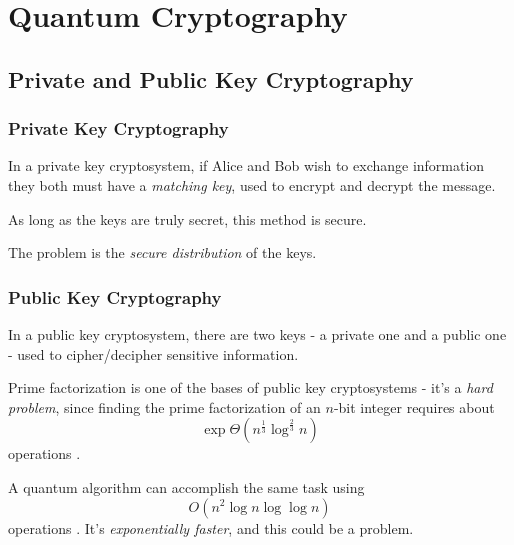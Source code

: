 \documentclass{beamer}
\begin{document}
  \section{Quantum Cryptography}

  \subsection{Private and Public Key Cryptography}
  \begin{frame}
    \frametitle{Private Key Cryptography}
    In a private key cryptosystem, if Alice and Bob wish to exchange information they
    both must have a \textit{matching key}, used to encrypt and decrypt the message.

    As long as the keys are truly secret, this method is secure.

    The problem is the \textit{secure distribution}
    of the keys.
  \end{frame}
  \begin{frame}
    \frametitle{Public Key Cryptography}
    In a public key cryptosystem, there are two keys - a private one and a public one - used to cipher/decipher
    sensitive information.

    Prime factorization is one of the bases of public key cryptosystems - it's a \textit{hard problem},
    since finding the prime factorization of an $n$-bit integer requires about
    \begin{equation*}
      \exp{\Theta\left(n^{\frac13}\log^{\frac23}n\right)}
    \end{equation*}
    operations \cite{shor}.
    
    A quantum algorithm can accomplish the same task using
    \begin{equation*}
      O\left(n^2\log n \log\log n\right)
    \end{equation*}
    operations \cite{shor}.
    It's \textit{exponentially faster}, and this could be a problem.
  \end{frame}
\end{document}
